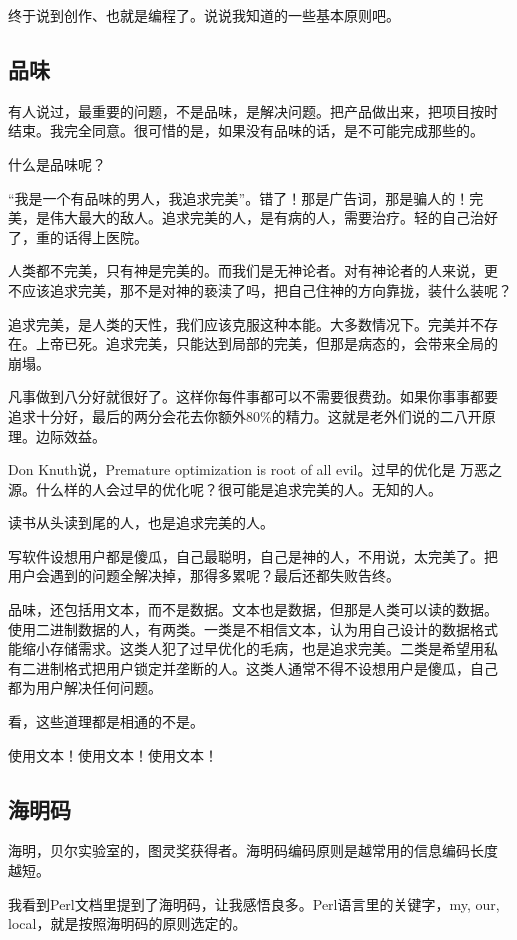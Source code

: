 \documentclass[10pt]{article}
\begin{document}
\begin{CJK*}{UTF8}{simsun}
终于说到创作、也就是编程了。说说我知道的一些基本原则吧。

\subsection{品味}

有人说过，最重要的问题，不是品味，是解决问题。把产品做出来，把项目按时
结束。我完全同意。很可惜的是，如果没有品味的话，是不可能完成那些的。

什么是品味呢？

“我是一个有品味的男人，我追求完美”。错了！那是广告词，那是骗人的！完
美，是伟大最大的敌人。追求完美的人，是有病的人，需要治疗。轻的自己治好
了，重的话得上医院。

人类都不完美，只有神是完美的。而我们是无神论者。对有神论者的人来说，更
不应该追求完美，那不是对神的亵渎了吗，把自己住神的方向靠拢，装什么装呢？

追求完美，是人类的天性，我们应该克服这种本能。大多数情况下。完美并不存
在。上帝已死。追求完美，只能达到局部的完美，但那是病态的，会带来全局的
崩塌。

凡事做到八分好就很好了。这样你每件事都可以不需要很费劲。如果你事事都要
追求十分好，最后的两分会花去你额外80\%的精力。这就是老外们说的二八开原
理。边际效益。

Don Knuth说，Premature optimization is root of all evil。过早的优化是
万恶之源。什么样的人会过早的优化呢？很可能是追求完美的人。无知的人。

读书从头读到尾的人，也是追求完美的人。

写软件设想用户都是傻瓜，自己最聪明，自己是神的人，不用说，太完美了。把
用户会遇到的问题全解决掉，那得多累呢？最后还都失败告终。

品味，还包括用文本，而不是数据。文本也是数据，但那是人类可以读的数据。
使用二进制数据的人，有两类。一类是不相信文本，认为用自己设计的数据格式
能缩小存储需求。这类人犯了过早优化的毛病，也是追求完美。二类是希望用私
有二进制格式把用户锁定并垄断的人。这类人通常不得不设想用户是傻瓜，自己
都为用户解决任何问题。

看，这些道理都是相通的不是。

使用文本！使用文本！使用文本！

\subsection{海明码}

海明，贝尔实验室的，图灵奖获得者。海明码编码原则是越常用的信息编码长度
越短。

我看到Perl文档里提到了海明码，让我感悟良多。Perl语言里的关键字，my,
our, local，就是按照海明码的原则选定的。


\end{CJK*}
\end{document}
